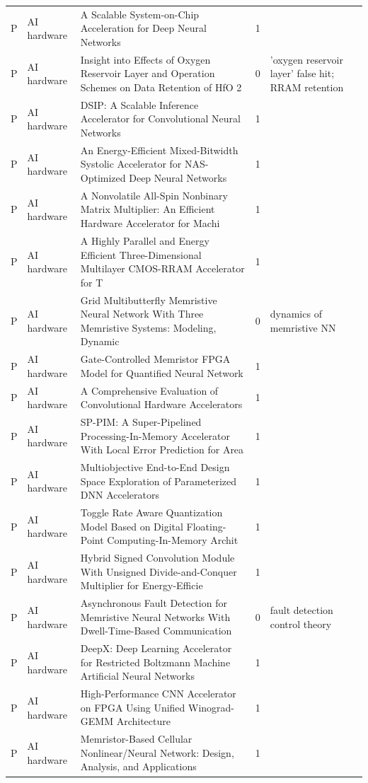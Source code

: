 \documentclass[10pt]{article}
\begin{document}
\begin{longtable}{@{}llL{8.6cm}lL{4.2cm}@{}}
P & AI hardware & A Scalable System-on-Chip Acceleration for Deep Neural Networks & 1 &  \\
P & AI hardware & Insight into Effects of Oxygen Reservoir Layer and Operation Schemes on Data Retention of HfO 2 & 0 & 'oxygen reservoir layer' false hit; RRAM retention \\
P & AI hardware & DSIP: A Scalable Inference Accelerator for Convolutional Neural Networks & 1 &  \\
P & AI hardware & An Energy-Efficient Mixed-Bitwidth Systolic Accelerator for NAS-Optimized Deep Neural Networks & 1 &  \\
P & AI hardware & A Nonvolatile All-Spin Nonbinary Matrix Multiplier: An Efficient Hardware Accelerator for Machi & 1 &  \\
P & AI hardware & A Highly Parallel and Energy Efficient Three-Dimensional Multilayer CMOS-RRAM Accelerator for T & 1 &  \\
P & AI hardware & Grid Multibutterfly Memristive Neural Network With Three Memristive Systems: Modeling, Dynamic  & 0 & dynamics of memristive NN \\
P & AI hardware & Gate-Controlled Memristor FPGA Model for Quantified Neural Network & 1 &  \\
P & AI hardware & A Comprehensive Evaluation of Convolutional Hardware Accelerators & 1 &  \\
P & AI hardware & SP-PIM: A Super-Pipelined Processing-In-Memory Accelerator With Local Error Prediction for Area & 1 &  \\
P & AI hardware & Multiobjective End-to-End Design Space Exploration of Parameterized DNN Accelerators & 1 &  \\
P & AI hardware & Toggle Rate Aware Quantization Model Based on Digital Floating-Point Computing-In-Memory Archit & 1 &  \\
P & AI hardware & Hybrid Signed Convolution Module With Unsigned Divide-and-Conquer Multiplier for Energy-Efficie & 1 &  \\
P & AI hardware & Asynchronous Fault Detection for Memristive Neural Networks With Dwell-Time-Based Communication & 0 & fault detection control theory \\
P & AI hardware & DeepX: Deep Learning Accelerator for Restricted Boltzmann Machine Artificial Neural Networks & 1 &  \\
P & AI hardware & High-Performance CNN Accelerator on FPGA Using Unified Winograd-GEMM Architecture & 1 &  \\
P & AI hardware & Memristor-Based Cellular Nonlinear/Neural Network: Design, Analysis, and Applications & 1 &  \\

\end{longtable}
\end{document}
